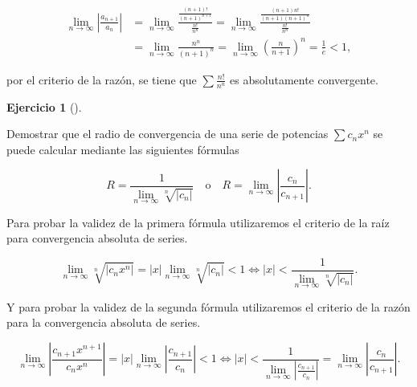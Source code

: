 \documentclass[
  spanish,
  a4paper,
]{scrreport}
\theoremstyle{definition}
\newtheorem{exercise}{Ejercicio}[chapter]
\theoremstyle{remark}
\begin{document}
\begin{tcolorbox}
\begin{enumerate}
  \begin{align*}
   \lim_{n\to\infty} \left|\frac{a_{n+1}}{a_n}\right| &= \lim_{n\to\infty} \frac{\frac{(n+1)!}{(n+1)^{n+1}}}{\frac{n!}{n^n}} = \lim_{n\to\infty} \frac{\frac{(n+1)n!}{(n+1)(n+1)^n}}{\frac{n!}{n^n}} \\
   & = \lim_{n\to\infty} \frac{n^n}{(n+1)^n} = \lim_{n\to\infty} \left(\frac{n}{n+1}\right)^n = \frac{1}{e}<1,
   \end{align*}

  por el criterio de la razón, se tiene que \(\sum \frac{n!}{n^n}\) es
  absolutamente convergente.
\end{enumerate}

\end{tcolorbox}

\begin{exercise}[]\protect\hypertarget{exr-radio-convergencia-raiz-razon}{}\label{exr-radio-convergencia-raiz-razon}

Demostrar que el radio de convergencia de una serie de potencias
\(\sum c_nx^n\) se puede calcular mediante las siguientes fórmulas

\[
R = \frac{1}{\lim_{n\to\infty} \sqrt[n]{|c_n|}} \quad \mbox{o}\quad R = \lim_{n\to\infty} \left|\frac{c_n}{c_{n+1}}\right|.
\]

\end{exercise}

\begin{tcolorbox}[enhanced jigsaw, arc=.35mm, bottomrule=.15mm, bottomtitle=1mm, breakable, colback=white, colbacktitle=quarto-callout-tip-color!10!white, colframe=quarto-callout-tip-color-frame, coltitle=black, left=2mm, leftrule=.75mm, opacityback=0, opacitybacktitle=0.6, rightrule=.15mm, title=\textcolor{quarto-callout-tip-color}{\faLightbulb}\hspace{0.5em}{Solución}, titlerule=0mm, toprule=.15mm, toptitle=1mm]

Para probar la validez de la primera fórmula utilizaremos el criterio de
la raíz para convergencia absoluta de series.

\[
\lim_{n\to\infty} \sqrt[n]{|c_nx^n|} = |x| \lim_{n\to\infty}\sqrt[n]{|c_n|} < 1 \Leftrightarrow |x| < \frac{1}{\lim_{n\to\infty} \sqrt[n]{|c_n|}}.
\]

Y para probar la validez de la segunda fórmula utilizaremos el criterio
de la razón para la convergencia absoluta de series.

\[
\lim_{n\to\infty} \left|\frac{c_{n+1}x^{n+1}}{c_nx^n}\right| = |x|\lim_{n\to\infty} \left|\frac{c_{n+1}}{c_n}\right| < 1 \Leftrightarrow |x| < \frac{1}{\lim_{n\to\infty} \left|\frac{c_{n+1}}{c_n}\right|} = \lim_{n\to\infty} \left|\frac{c_n}{c_{n+1}}\right|.
\]

\end{tcolorbox}
\end{document}
